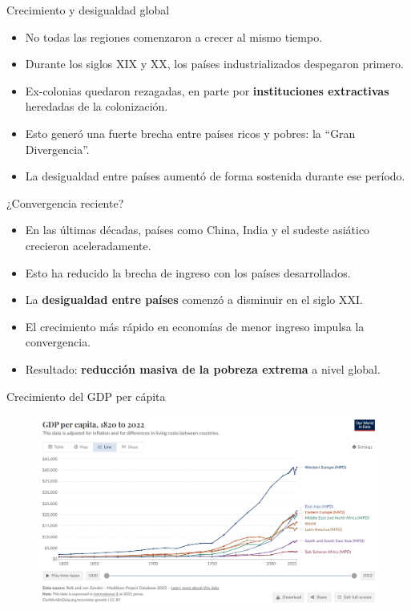\documentclass{beamer}
\begin{document}
\begin{frame}{Crecimiento y desigualdad global}
    \begin{itemize}
        \item No todas las regiones comenzaron a crecer al mismo tiempo.
        \item Durante los siglos XIX y XX, los países industrializados despegaron primero.
        \item Ex-colonias quedaron rezagadas, en parte por \textbf{instituciones extractivas} heredadas de la colonización.
        \item Esto generó una fuerte brecha entre países ricos y pobres: la “Gran Divergencia”.
        \item La desigualdad entre países aumentó de forma sostenida durante ese período.
    \end{itemize}
\end{frame}

\begin{frame}{¿Convergencia reciente?}
    \begin{itemize}
        \item En las últimas décadas, países como China, India y el sudeste asiático crecieron aceleradamente.
        \item Esto ha reducido la brecha de ingreso con los países desarrollados.
        \item La \textbf{desigualdad entre países} comenzó a disminuir en el siglo XXI.
        \item El crecimiento más rápido en economías de menor ingreso impulsa la convergencia.
        \item Resultado: \textbf{reducción masiva de la pobreza extrema} a nivel global.
    \end{itemize}
\end{frame}


\begin{frame}{Crecimiento del GDP per cápita}
    \begin{figure} [H]   
        \includegraphics[scale=0.4]{../Figures/gpd_pc_ourworldindata.png}
    \end{figure}
\end{frame}
\end{document}
